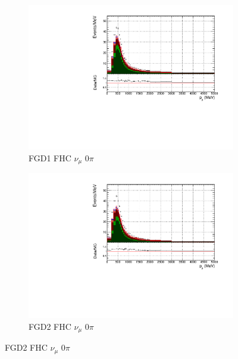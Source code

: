 \begin{figure}[!t]
\begin{subfigure}{0.49\textwidth}
  \centering
  \includegraphics[width=\textwidth]{figs/FGD1_numuCC_0pi_p}
  \caption{FGD1 FHC $\nu_{\mu}$ 0$\pi$}
\end{subfigure}
\begin{subfigure}{0.49\textwidth}
  \centering
  \includegraphics[width=\textwidth]{figs/FGD2_numuCC_0pi_p}
  \caption{FGD2 FHC $\nu_{\mu}$ 0$\pi$}
\end{subfigure}


\end{figure}
